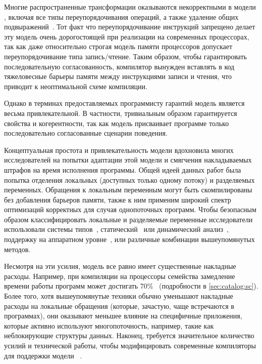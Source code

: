 Многие распространенные трансформации оказываются 
некорректными в модели \SC, включая 
все типы переупорядочивания операций, 
а также удаление общих подвыражений~\cite{Marino-al:PLDI11, Sevcik-Aspinall:ECOOP08}.
Тот факт что переупорядочивание инструкций запрещено 
делает эту модель очень дорогостоящей при реализации
на современных процессорах, так как даже 
относительно строгая модель памяти процессоров \Intel
допускает переупорядочивание типа запись/чтение. 
Таким образом, чтобы гарантировать последовательную согласованность, 
компилятор вынужден вставлять в код тяжеловесные 
барьеры памяти между инструкциями записи и чтения,
что приводит к неоптимальной схеме компиляции. 

Однако в терминах предоставляемых программисту гарантий 
модель \SC является весьма привлекательной. 
В частности, тривиальным образом гарантируется свойства \eDRF и когерентности, 
так как модель присваивает программе только 
последовательно согласованные сценарии поведения. 

Концептуальная простота и привлекательность модели \SC 
вдохновила многих исследователей на попытки 
адаптации этой модели и смягчения накладываемых 
штрафов на время исполнения программы. 
Общей идеей данных работ была попытка 
отделения локальных (доступных только одному потоку) 
и разделяемых переменных.
Обращения к локальным переменным могут быть скомпилированы 
без добавления барьеров памяти, также к ним 
применим широкий спектр оптимизаций корректных 
для случая однопоточных программ. 
Чтобы безопасным образом классифицировать 
локальные и разделяемые переменные исследователи 
использовали системы типов~\cite{Vollmer-al:PPoPP17},
статический~\cite{Singh-al:ISCA12} или динамический анализ~\cite{Liu-al:PLDI19}, 
поддержку на аппаратном уровне~\cite{Singh-al:ISCA12, Marino-al:PLDI10}, 
или различные комбинации вышеупомянутых методов.  

Несмотря на эти усилия, модель \SC все равно имеет существенные накладные расходы. 
Например, при компиляции на процессоры семейства 
замедление времени работы программ может достигать 70\%~\cite{Liu-al:PLDI19}
(\see подробности в \cref{sec:catalog:sc}).
Более того, хотя вышеупомянутые техники обычно уменьшают 
накладные расходы на локальные обращения 
(которые, зачастую, чаще встречаются в программах),
они оказывают меньшее влияние на специфичные приложения, 
которые активно используют многопоточность, 
например, такие как неблокирующие структуры данных.
Наконец, требуется значительное количество усилий 
и технической работы, чтобы модифицировать 
современные компиляторы для поддержки модели \SC~\cite{Marino-al:PLDI11, Liu-al:PLDI19}.

